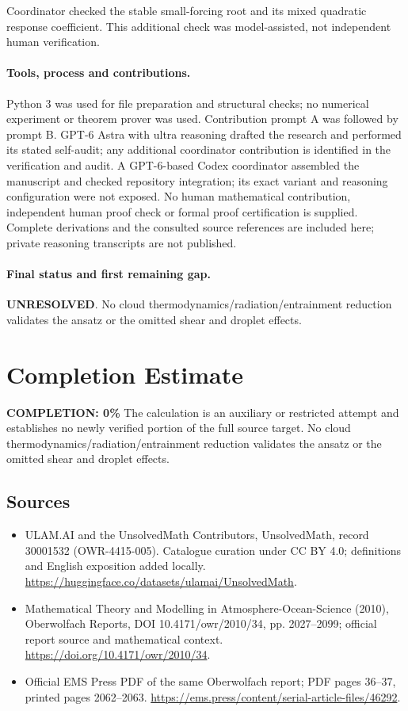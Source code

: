 \documentclass[11pt]{article}
\begin{document}
Coordinator checked the stable small-forcing root and its mixed quadratic response coefficient. This additional check was model-assisted, not independent human verification.

\paragraph{Tools, process and contributions.}
Python 3 was used for file preparation and structural checks; no numerical experiment or theorem prover was used. Contribution prompt A was followed by prompt B. GPT-6 Astra with ultra reasoning drafted the research and performed its stated self-audit; any additional coordinator contribution is identified in the verification and audit. A GPT-6-based Codex coordinator assembled the manuscript and checked repository integration; its exact variant and reasoning configuration were not exposed. No human mathematical contribution, independent human proof check or formal proof certification is supplied. Complete derivations and the consulted source references are included here; private reasoning transcripts are not published.

\paragraph{Final status and first remaining gap.}
\textbf{UNRESOLVED}. No cloud thermodynamics/radiation/entrainment reduction validates the ansatz or the omitted shear and droplet effects.

\section{Completion Estimate}
\noindent\textbf{COMPLETION: 0\%}
The calculation is an auxiliary or restricted attempt and establishes no newly verified portion of the full source target. No cloud thermodynamics/radiation/entrainment reduction validates the ansatz or the omitted shear and droplet effects.

\subsection{Sources}
\begin{itemize}
\item[\hypertarget{source:30001532:1}{S1}] ULAM.AI and the UnsolvedMath Contributors, UnsolvedMath, record 30001532 (OWR-4415-005). Catalogue curation under CC BY 4.0; definitions and English exposition added locally.
\url{https://huggingface.co/datasets/ulamai/UnsolvedMath}.
\item[\hypertarget{source:30001532:2}{S2}] Mathematical Theory and Modelling in Atmosphere-Ocean-Science (2010), Oberwolfach Reports, DOI 10.4171/owr/2010/34, pp. 2027--2099; official report source and mathematical context.
\url{https://doi.org/10.4171/owr/2010/34}.
\item[\hypertarget{source:30001532:3}{S3}] Official EMS Press PDF of the same Oberwolfach report; PDF pages 36--37, printed pages 2062--2063.
\url{https://ems.press/content/serial-article-files/46292}.
\end{itemize}
\label{end:30001532}
\end{document}
